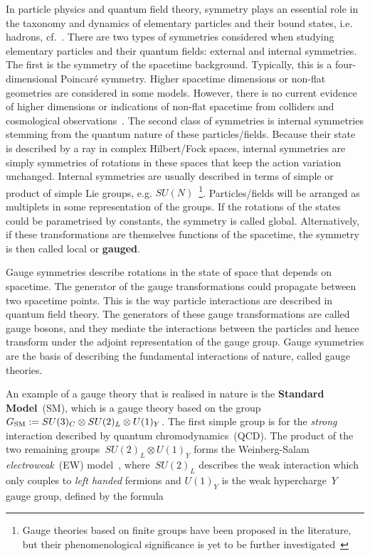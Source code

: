 \par In particle physics and quantum field theory, symmetry plays an essential role in the taxonomy and dynamics of elementary particles and their bound states, i.e. hadrons, cf.~\cite{osti_4008239,PhysRev.96.191}. There are two types of symmetries considered when studying elementary particles and their quantum fields: external and internal symmetries. The first is the symmetry of the spacetime background. Typically, this is a four-dimensional Poincar\'e symmetry.  Higher spacetime dimensions or non-flat geometries are considered in some models. However, there is no current evidence of higher dimensions or indications of non-flat spacetime from colliders and cosmological observations~\cite{Zyla:2020zbs}. The second class of symmetries is internal symmetries stemming from the quantum nature of these particles/fields. Because their state is described by a {ray} in complex Hilbert/Fock spaces, internal symmetries are simply symmetries of rotations in these spaces that keep the action variation unchanged. Internal symmetries are usually described in terms of simple or product of simple {Lie groups}, e.g. $SU(N)$~\footnote{Gauge theories based on finite groups have been proposed in the literature, but their phenomenological significance is yet to be further investigated~\cite{Freed1993LecturesOT,dijkgraaf1990topological}}. Particles/fields will be arranged as multiplets in some representation of the groups. If the rotations of the states could be parametrised by constants, the symmetry is called {global}. Alternatively, if these transformations are themselves functions of the spacetime,  the symmetry is then called {local} or \textbf{gauged}.
\par Gauge symmetries describe rotations in the state of space that depends on spacetime. The generator of the gauge transformations could propagate between two spacetime points. This is the way particle interactions are described in quantum field theory. The generators of these gauge transformations are called gauge bosons, and they mediate the interactions between the particles and hence transform under the adjoint representation of the gauge group. Gauge symmetries are the basis of describing the fundamental interactions of nature,  called gauge theories.
\par An example of a gauge theory that is realised in nature is the \textbf{Standard Model}~(SM), which is a gauge theory based on the group~$G_{\mathrm{SM}}:=SU(3)_C \otimes SU(2)_L \otimes U(1)_Y$. The first simple group is for the \textit{strong} interaction described by quantum chromodynamics~(QCD). The product of the two remaining groups~$SU(2)_L \otimes U(1)_Y$ forms the Weinberg-Salam \textit{electroweak}~(EW) model~\cite{salam2,salam1,PhysRevLett.19.1264}, where~$SU(2)_L$ describes the weak interaction which only couples to \emph{left handed} fermions and $U(1)_Y$ is the weak hypercharge~$Y$ gauge group, defined by the formula
